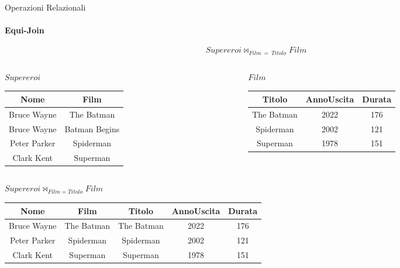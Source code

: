     \begin{frame}{Operazioni Relazionali}
        \framesubtitle{Equi-Join}
        \vspace{-1.2cm}
        \[ Supereroi \bowtie_{Film~=~Titolo} Film\]
        \vspace{-.5cm}
        \begin{columns}
            \begin{column}{0.48\textwidth}
                \centering
                {\small $Supereroi$}
                \newline
        \begin{tabular}{|c|c|}
            \hline
            \rowcolor{cyan!30}Nome & Film \\
            \hline
            Bruce Wayne & The Batman \\ \hline
            Bruce Wayne & Batman Begins \\ \hline
            Peter Parker & Spiderman \\ \hline
            Clark Kent & Superman\\ \hline
            \end{tabular}
            \end{column}
            \begin{column}{0.48\textwidth}
                \centering
                {\small $Film$}
                \newline
                \begin{tabular}{|c|c|c|}
                    \hline
                    \rowcolor{cyan!30} Titolo & AnnoUscita & Durata \\ \hline
                    The Batman & 2022 & 176 \\ \hline
                    Spiderman & 2002 & 121 \\ \hline
                    Superman & 1978 & 151 \\ \hline
                    \end{tabular}
            \end{column}
        \end{columns}
        \vspace{.5cm}
        \centering
        \pause
        {\small $Supereroi \bowtie_{Film=Titolo} Film$
        \begin{tabular}{|c|c|c|c|c|}
            \hline
            \rowcolor{cyan!30} Nome & Film & Titolo & AnnoUscita & Durata\\ \hline
            Bruce Wayne & The Batman & The Batman & 2022 & 176 \\ \hline
            Peter Parker & Spiderman & Spiderman & 2002 & 121 \\ \hline
            Clark Kent & Superman & Superman & 1978 & 151\\ \hline
            \end{tabular}}
    \end{frame}
